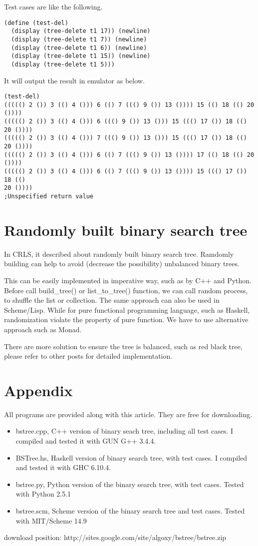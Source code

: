 \documentclass{article}
\begin{document}
Test cases are like the following.

\begin{lstlisting}
(define (test-del)
  (display (tree-delete t1 17)) (newline)
  (display (tree-delete t1 7)) (newline)
  (display (tree-delete t1 6)) (newline)
  (display (tree-delete t1 15)) (newline)
  (display (tree-delete t1 5)))
\end{lstlisting}

It will output the result in emulator as below.

\begin{verbatim}
(test-del)
((((() 2 ()) 3 (() 4 ())) 6 (() 7 ((() 9 ()) 13 ()))) 15 (() 18 (() 20 ())))
((((() 2 ()) 3 (() 4 ())) 6 ((() 9 ()) 13 ())) 15 ((() 17 ()) 18 (() 20 ())))
((((() 2 ()) 3 (() 4 ())) 7 ((() 9 ()) 13 ())) 15 ((() 17 ()) 18 (() 20 ())))
((((() 2 ()) 3 (() 4 ())) 6 (() 7 ((() 9 ()) 13 ()))) 17 (() 18 (() 20 ())))
((((() 2 ()) 3 (() 4 ())) 6 (() 7 ((() 9 ()) 13 ()))) 15 ((() 17 ()) 18 (() 
20 ())))
;Unspecified return value
\end{verbatim}

\section{Randomly built binary search tree}
In CRLS\cite{CLRS}, it described about randomly built binary search tree.
Ramdomly building can help to avoid (decrease the possibility) unbalanced
binary trees.

This can be easily implemented in imperative way, such as by C++ and Python.
Before call build\_tree() or list\_to\_tree() function, we can call random
process, to shuffle the list or collection. The same approach can also be
used in Scheme/Lisp. While for pure functional programming language, such as
Haskell, randomization violate the property of pure function. We have to
use alternative approach such as Monad.

There are more solution to ensure the tree is balanced, such as red black tree,
please refer to other posts for detailed implementation.

\section{Appendix} \label{appendix}
All programs are provided along with this article. They are free for downloading.
\begin{itemize}
\item bstree.cpp, C++ version of binary seach tree, including all test cases. I 
compiled and tested it with GUN G++ 3.4.4.
\item BSTree.hs, Haskell version of binary search tree, with test cases. I compiled
and tested it with GHC 6.10.4.
\item bstree.py, Python version of the binary search tree, with test cases. Tested
with Python 2.5.1
\item bstree.scm, Scheme version of the binary search tree and test cases. Tested
with MIT/Scheme 14.9
\end{itemize}
download position: http://sites.google.com/site/algoxy/bstree/bstree.zip
\end{document}
